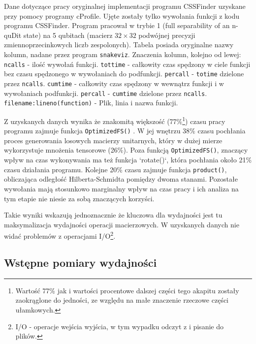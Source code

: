 \documentclass[10pt, a4paper]{article}
\newcommand{\code}[1]{\texttt{#1}}
\begin{document}
\begin{sloppypar}
    \FloatBarrier
    \begin{table}[!ht]
      \tiny
      \centering
      
      \caption{{} Dane dotyczące pracy oryginalnej implementacji programu CSSFinder uzyskane przy pomocy programy cProfile. Ujęte zostały tylko wywołania funkcji z kodu programu CSSFinder. Program pracował w trybie 1 (full separability of an n-quDit state) na 5 qubitach (macierz $3
      2\times32$ podwójnej precyzji zmiennoprzecinkowych liczb zespolonych). Tabela posiada oryginalne nazwy kolumn, nadane przez program \code{snakeviz}. Znaczenia kolumn, kolejno od lewej: \code{ncalls} - ilość wywołań funkcji. \code{tottime} - całkowity czas spędzony w ciele funkcji bez czasu spędzonego w wywołaniach do podfunkcji. \code{percall} - \code{totime} dzielone przez \code{ncalls}. \code{cumtime} - całkowity czas spędzony w wewnątrz funkcji i w wywołaniach podfunkcji. \code{percall} - \code{cumtime} dzielone przez \code{ncalls}. \code{filename:lineno(function)} - Plik, linia i nazwa funkcji.}
    \end{table}
    \FloatBarrier

    Z uzyskanych danych wynika że znakomitą większość (77\%\footnote{Wartość 77\% jak i
    wartości procentowe dalszej części tego akapitu zostały zaokrąglone do jedności, ze względu
    na małe znaczenie rzeczowe części ułamkowych.}) czasu pracy programu zajmuje funkcja
    \code{OptimizedFS()} . W jej wnętrzu 38\% czasu pochłania proces generowania
    losowych macierzy unitarnych, który w dużej mierze wykorzystuje mnożenia tensorowe (26\%).
    Poza funkcją \code{OptimizedFS()}, znaczący wpływ na czas wykonywania ma też funkcja
    `rotate()`, która pochłania około 21\% czasu działania programu. Kolejne 20\% czasu zajmuje
    funkcja \code{product()}, obliczająca odległość Hilberta-Schmidta pomiędzy dwoma stanami.
    Pozostałe wywołania mają stosunkowo marginalny wpływ na czas pracy i ich analiza na
    tym etapie nie niesie za sobą znaczących korzyści.

    Takie wyniki wskazują jednoznacznie że kluczowa dla wydajności jest tu
    maksymalizacja wydajności operacji macierzowych. W uzyskanych danych nie widać problemów
    z operacjami I/O\footnote{I/O - operacje wejścia wyjścia, w tym wypadku odczyt z i pisanie
    do plików.}.

    \subsection{Wstępne pomiary wydajności}



\end{sloppypar}
\end{document}
